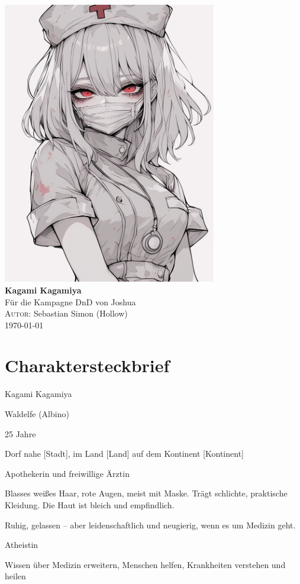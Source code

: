 \documentclass[12pt,a4paper]{article}
\newcommand{\AuthorName}{Sebastian Simon (Hollow)}
\begin{document}
\begin{titlepage}
    \centering
    \vspace*{2cm}
    \includegraphics[width=0.7\textwidth]{kagami.jpg}\\[1.5cm]
    {\Huge\bfseries Kagami Kagamiya}\\[0.5cm]
    {\Large Für die Kampagne DnD von Joshua}\\[2cm]
    \vfill
    \textsc{Autor:} \AuthorName \\
    \vfill
    \today
\end{titlepage}

\newpage
\tableofcontents
\newpage

\section*{Charaktersteckbrief}
\begin{description}[style=nextline]
  \item[Name:] Kagami Kagamiya
  \item[Rasse:] Waldelfe (Albino)
  \item[Alter:] 25 Jahre
  \item[Herkunft:] Dorf nahe [Stadt], im Land [Land] auf dem Kontinent [Kontinent]
  \item[Beruf:] Apothekerin und freiwillige Ärztin
  \item[Aussehen:] Blasses weißes Haar, rote Augen, meist mit Maske. Trägt schlichte, praktische Kleidung. Die Haut ist bleich und empfindlich.
  \item[Charakter:] Ruhig, gelassen – aber leidenschaftlich und neugierig, wenn es um Medizin geht.
  \item[Glaube:] Atheistin
  \item[Ziele:] Wissen über Medizin erweitern, Menschen helfen, Krankheiten verstehen und heilen
\end{description}
\end{document}
